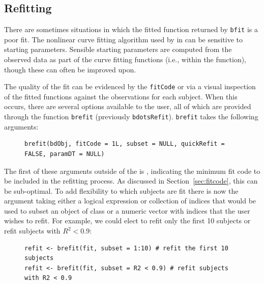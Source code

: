 \subsection{Refitting}

There are sometimes situations in which the fitted function returned by \texttt{bfit} is a poor fit. The nonlinear curve fitting algorithm used by  in  can be sensitive to starting parameters. Sensible starting parameters are computed from the observed data as part of the curve fitting functions (i.e., within the  function), though these can often be improved upon.


The quality of the fit can be evidenced by the \texttt{fitCode} or via a visual inspection of the fitted functions against the observations for each subject.  When this occurs, there are several options available to the user, all of which are provided through the function \texttt{brefit} (previously \texttt{bdotsRefit}). \texttt{brefit} takes the following arguments:

\begin{singlespace}
\begin{figure}[H]
\centering
\begin{BVerbatim}
brefit(bdObj, fitCode = 1L, subset = NULL, quickRefit = FALSE, paramDT = NULL)
\end{BVerbatim}
\end{figure}
\end{singlespace}

The first of these arguments outside of the  is , indicating the minimum fit code to be included in the refitting process. As discussed in Section~\ref{sec:fitcode}, this can be sub-optimal. To add flexibility to which subjects are fit there is now the  argument taking either a logical expression or collection of indices that would be used to subset an object of class  or a numeric vector with indices that the user wishes to refit. For example, we could elect to refit only the first 10 subjects or refit subjects with $R^2 < 0.9$:

\begin{singlespace}
\begin{figure}[H]
\centering
\begin{BVerbatim}
refit <- brefit(fit, subset = 1:10) # refit the first 10 subjects
refit <- brefit(fit, subset = R2 < 0.9) # refit subjects with R2 < 0.9
\end{BVerbatim}
\end{figure}
\end{singlespace}

